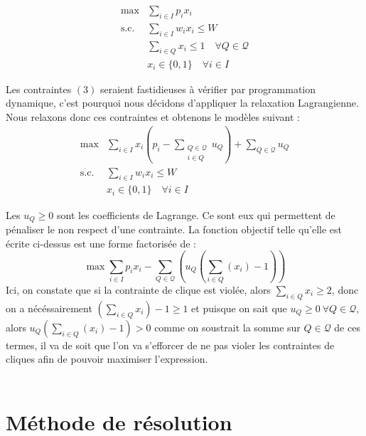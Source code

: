 \documentclass[french,nochapter,11pt]{rapportUB}
\begin{document}
	\begin{align}
		\max & \sum_{i \in I} p_i x_i \\
		\text{s.c.} & \sum_{i \in I} w_i x_i \leq W \\
		& \sum_{i \in Q} x_i \leq 1 \quad \forall Q \in \mathcal{Q} \\
		& x_i \in \{0,1\} \quad \forall i \in I
	\end{align}
	
	Les contraintes $(3)$ seraient fastidieuses à vérifier par programmation dynamique, c'est pourquoi nous décidons d'appliquer la relaxation Lagrangienne. Nous relaxons donc ces contraintes et obtenons le modèles suivant : \\
	
	\begin{align}
		\max & \sum_{i \in I} x_i(p_i - \sum_{\substack{Q \in \mathcal{Q} \\ i \in Q}} u_Q) + \sum_{Q \in \mathcal{Q}}u_Q \\
		\text{s.c.} & \sum_{i \in I} w_i x_i \leq W \\
		& x_i \in \{0,1\} \quad \forall i \in I
	\end{align}
	
	Les $u_Q \geq 0$ sont les coefficients de Lagrange. Ce sont eux qui permettent de pénaliser le non respect d'une contrainte. La fonction objectif telle qu'elle est écrite ci-dessus est une forme factorisée de : \\
	\[
	\max \sum_{i \in I} p_i x_i - \sum_{Q \in \mathcal{Q}}(u_Q(\sum_{i \in Q}(x_i)  -1 ))
	\]
	Ici, on constate que si la contrainte de clique est violée, alors $\sum_{i \in Q}x_i \geq 2$, donc on a nécéssairement $(\sum_{i \in Q}x_i)-1 \geq 1$ et puisque on sait que $u_Q \geq 0 ~ \forall Q \in \mathcal{Q}$, alors
	$u_Q(\sum_{i \in Q}(x_i) -1) > 0$ comme on soustrait la somme sur $Q \in \mathcal{Q}$ de ces termes, il va de soit que l'on va s'efforcer de ne pas violer les contraintes de cliques afin de pouvoir maximiser l'expression. \\ \\
	
	\section{Méthode de résolution}
	
\end{document}
